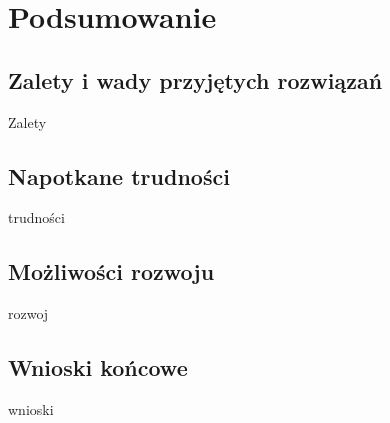 \documentclass[12pt]{article}
\begin{document}
\begin{sloppypar}
\section{Podsumowanie}
{
  \subsection{Zalety i wady przyjętych rozwiązań}
  {
    Zalety
  }
  \subsection{Napotkane trudności}
  {
    trudności
  }
  \subsection{Możliwości rozwoju}
  {
    rozwoj
  }
  \subsection{Wnioski końcowe}
  {
    wnioski
  }
}

\clearpage
\printbibliography[
  heading=bibintoc,
  title={Bibliografia}
]

\clearpage
\listoffigures

\clearpage
\listoftables

\clearpage
{}
\lstlistoflistings

\end{sloppypar}
\end{document}

